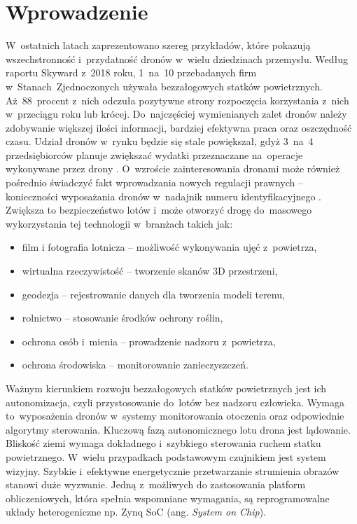 \chapter{Wprowadzenie}
\label{cha:wprowadzenie}



W~ostatnich latach zaprezentowano szereg przykładów, które pokazują wszechstronność i~przydatność dronów w~wielu dziedzinach przemysłu. 
Według raportu Skyward z~2018 roku, 1~na~10 przebadanych firm w~Stanach~Zjednoczonych używała bezzałogowych statków powietrznych. 
Aż~88~procent z~nich odczuła pozytywne strony rozpoczęcia korzystania z~nich w~przeciągu roku lub krócej. 
Do~najczęściej wymienianych zalet dronów należy zdobywanie większej ilości informacji, bardziej efektywna praca oraz oszczędność czasu. 
Udział dronów w~rynku będzie się stale powiększał, gdyż 3~na~4 przedsiębiorców planuje zwiększać wydatki przeznaczane na~operacje wykonywane przez drony \cite{skyward}. 
O~wzroście zainteresowania dronami może również pośrednio świadczyć fakt wprowadzania nowych regulacji prawnych -- konieczności wyposażania dronów w~nadajnik numeru identyfikacyjnego \cite{drone_article}. 
Zwiększa to bezpieczeństwo lotów i~może otworzyć drogę do~masowego wykorzystania tej technologii w~branżach takich jak:
\begin{itemize}
	\item film i fotografia lotnicza -- możliwość wykonywania ujęć z~powietrza,
	\item wirtualna rzeczywistość -- tworzenie skanów 3D przestrzeni,
	\item geodezja -- rejestrowanie danych dla tworzenia modeli terenu,
	\item rolnictwo -- stosowanie środków ochrony roślin,
	\item ochrona osób i~mienia -- prowadzenie nadzoru z~powietrza,
	\item ochrona środowiska -- monitorowanie zanieczyszczeń.
\end{itemize}
\par Ważnym kierunkiem rozwoju bezzałogowych statków powietrznych jest ich autonomizacja, czyli przystosowanie do~lotów bez nadzoru człowieka. 
Wymaga to~wyposażenia dronów w~systemy monitorowania otoczenia oraz odpowiednie algorytmy sterowania.
Kluczową fazą autonomicznego lotu drona jest lądowanie. 
Bliskość ziemi wymaga dokładnego i~szybkiego sterowania ruchem statku powietrznego.
W~wielu przypadkach podstawowym czujnikiem jest system wizyjny.
Szybkie i~efektywne energetycznie przetwarzanie strumienia obrazów stanowi duże wyzwanie.
Jedną z~możliwych do zastosowania platform obliczeniowych, która spełnia wspomniane wymagania, są reprogramowalne układy heterogeniczne np. Zynq SoC (ang. \textit{System on Chip}).

